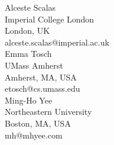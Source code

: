 \documentclass[a4paper,UKenglish]{dartsmaster}
\begin{document}
\begin{participants}
\participant	Alceste Scalas	\\	Imperial College London	\\	London, UK	\\	alceste.scalas@imperial.ac.uk	\\

\participant	Emma Tosch	\\	UMass Amherst	\\	Amherst, MA, USA	\\	etosch@cs.umass.edu	\\

\participant	Ming-Ho Yee	\\	Northeastern University	\\	Boston, MA, USA	\\	mh@mhyee.com	\\

\end{participants} 
\end{document}
